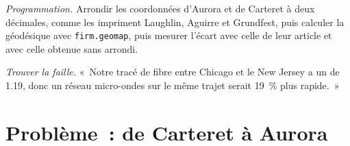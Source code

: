 \begin{exercise}[$\star\star\star$]\label{exo:nw:the-north-american-map:7}
\emph{Programmation.} Arrondir les coordonnées d'Aurora et de Carteret à deux décimales, comme les impriment Laughlin, Aguirre et Grundfest, puis calculer la géodésique
avec \texttt{firm.geomap}, puis mesurer l'écart avec celle de leur article et avec celle obtenue sans arrondi.
\end{exercise}

\begin{exercise}[$\star\star\star$]\label{exo:nw:the-north-american-map:8}
\emph{Trouver la faille.} «~Notre tracé de fibre entre Chicago et le New Jersey a un  de 1.19, donc un réseau micro-ondes sur le même trajet serait
19~\% plus rapide.~»
\end{exercise}

\section{Problème~: de Carteret à Aurora}

